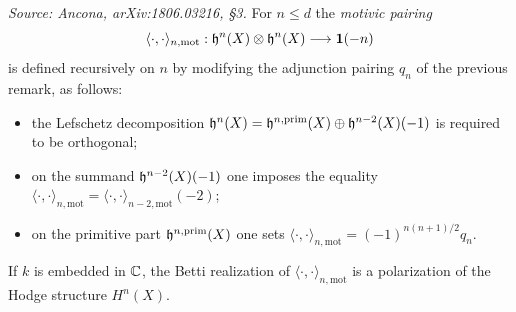 \begin{definition}
  \label{def:pairing-mot}
  \textit{Source: Ancona, arXiv:1806.03216, §3.}
  For \(n \leq d\) the \emph{motivic pairing}
  \[\langle \cdot, \cdot \rangle_{n,\mathrm{mot}} : \mathfrak{h}^n(X) \otimes \mathfrak{h}^{n}(X)
    \longrightarrow \mathbf{1}(-n)\]
  is defined recursively on \(n\) by modifying the adjunction pairing \(q_n\) of
  the previous remark, as follows:
  \begin{itemize}
    \item the Lefschetz decomposition
      \(\mathfrak{h}^{n}(X) = \mathfrak{h}^{n,\mathrm{prim}}(X) \oplus \mathfrak{h}^{n-2}(X)(-1)\) is required to be
      orthogonal;
    \item on the summand \(\mathfrak{h}^{n-2}(X)(-1)\) one imposes the equality
      \(\langle \cdot, \cdot \rangle_{n,\mathrm{mot}} =
      \langle \cdot, \cdot \rangle_{n-2,\mathrm{mot}}(-2)\);
    \item on the primitive part \(\mathfrak{h}^{n,\mathrm{prim}}(X)\) one sets
      \(\langle \cdot, \cdot \rangle_{n,\mathrm{mot}} = (-1)^{n(n+1)/2} q_n\).
  \end{itemize}
\end{definition}

\begin{remark}\label{rem:hodge-type-pola}
  If \(k\) is embedded in \(\mathbb{C}\), the Betti realization of
  \(\langle \cdot, \cdot \rangle_{n,\mathrm{mot}}\) is a polarization of the Hodge
  structure \(H^n(X)\).
\end{remark}

